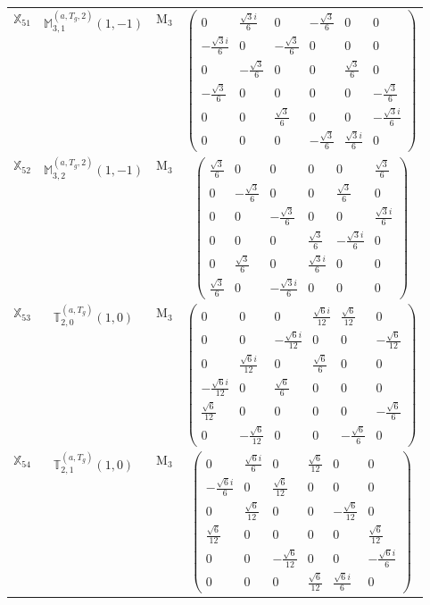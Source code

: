 \documentclass[fleqn,10pt,landscape]{article}
\begin{document}
\begin{itemize}
\begin{center}
\begin{longtable}{c|c|c|c}
$ \mathbb{X}_{51} $ & $\mathbb{M}_{3,1}^{(a,T_{g},2)}(1,-1)$ & M$_{3}$ & $\begin{pmatrix} 0 & \frac{\sqrt{3} i}{6} & 0 & - \frac{\sqrt{3}}{6} & 0 & 0 \\ - \frac{\sqrt{3} i}{6} & 0 & - \frac{\sqrt{3}}{6} & 0 & 0 & 0 \\ 0 & - \frac{\sqrt{3}}{6} & 0 & 0 & \frac{\sqrt{3}}{6} & 0 \\ - \frac{\sqrt{3}}{6} & 0 & 0 & 0 & 0 & - \frac{\sqrt{3}}{6} \\ 0 & 0 & \frac{\sqrt{3}}{6} & 0 & 0 & - \frac{\sqrt{3} i}{6} \\ 0 & 0 & 0 & - \frac{\sqrt{3}}{6} & \frac{\sqrt{3} i}{6} & 0 \end{pmatrix}$ \\
$ \mathbb{X}_{52} $ & $\mathbb{M}_{3,2}^{(a,T_{g},2)}(1,-1)$ & M$_{3}$ & $\begin{pmatrix} \frac{\sqrt{3}}{6} & 0 & 0 & 0 & 0 & \frac{\sqrt{3}}{6} \\ 0 & - \frac{\sqrt{3}}{6} & 0 & 0 & \frac{\sqrt{3}}{6} & 0 \\ 0 & 0 & - \frac{\sqrt{3}}{6} & 0 & 0 & \frac{\sqrt{3} i}{6} \\ 0 & 0 & 0 & \frac{\sqrt{3}}{6} & - \frac{\sqrt{3} i}{6} & 0 \\ 0 & \frac{\sqrt{3}}{6} & 0 & \frac{\sqrt{3} i}{6} & 0 & 0 \\ \frac{\sqrt{3}}{6} & 0 & - \frac{\sqrt{3} i}{6} & 0 & 0 & 0 \end{pmatrix}$ \\
$ \mathbb{X}_{53} $ & $\mathbb{T}_{2,0}^{(a,T_{g})}(1,0)$ & M$_{3}$ & $\begin{pmatrix} 0 & 0 & 0 & \frac{\sqrt{6} i}{12} & \frac{\sqrt{6}}{12} & 0 \\ 0 & 0 & - \frac{\sqrt{6} i}{12} & 0 & 0 & - \frac{\sqrt{6}}{12} \\ 0 & \frac{\sqrt{6} i}{12} & 0 & \frac{\sqrt{6}}{6} & 0 & 0 \\ - \frac{\sqrt{6} i}{12} & 0 & \frac{\sqrt{6}}{6} & 0 & 0 & 0 \\ \frac{\sqrt{6}}{12} & 0 & 0 & 0 & 0 & - \frac{\sqrt{6}}{6} \\ 0 & - \frac{\sqrt{6}}{12} & 0 & 0 & - \frac{\sqrt{6}}{6} & 0 \end{pmatrix}$ \\
$ \mathbb{X}_{54} $ & $\mathbb{T}_{2,1}^{(a,T_{g})}(1,0)$ & M$_{3}$ & $\begin{pmatrix} 0 & \frac{\sqrt{6} i}{6} & 0 & \frac{\sqrt{6}}{12} & 0 & 0 \\ - \frac{\sqrt{6} i}{6} & 0 & \frac{\sqrt{6}}{12} & 0 & 0 & 0 \\ 0 & \frac{\sqrt{6}}{12} & 0 & 0 & - \frac{\sqrt{6}}{12} & 0 \\ \frac{\sqrt{6}}{12} & 0 & 0 & 0 & 0 & \frac{\sqrt{6}}{12} \\ 0 & 0 & - \frac{\sqrt{6}}{12} & 0 & 0 & - \frac{\sqrt{6} i}{6} \\ 0 & 0 & 0 & \frac{\sqrt{6}}{12} & \frac{\sqrt{6} i}{6} & 0 \end{pmatrix}$ \\

\end{longtable}
\end{center}
\end{itemize}
\end{document}
